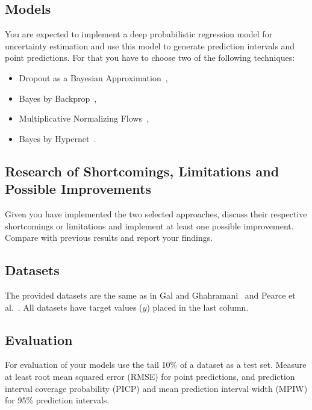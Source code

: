 \documentclass[a4paper, 12pt]{article}
\begin{document}
\subsection{Models}
\label{sec:Models}

You are expected to implement a deep probabilistic regression model for uncertainty estimation and
use this model to generate prediction intervals and point predictions. For that you have to choose
two of the following techniques:

\begin{itemize}
 \item Dropout as a Bayesian Approximation~\cite{pmlr-v48-gal16},
 \item Bayes by Backprop~\cite{pmlr-v37-blundell15},
 \item Multiplicative Normalizing Flows~\cite{pmlr-v70-louizos17a},
 \item Bayes by Hypernet~\cite{krueger2017bayesian,DBLP:journals/corr/abs-1711-01297}.
\end{itemize}


\subsection{Research of Shortcomings, Limitations and Possible Improvements}
\label{sec:Research}

Given you have implemented the two selected approaches, discuss their respective shortcomings or
limitations and implement at least one possible improvement. Compare with previous results and
report your findings.

\subsection{Datasets}
\label{sec:Datasets}

The provided datasets are the same as in Gal and Ghahramani~\cite{pmlr-v48-gal16} and Pearce et
al.~\cite{pmlr-v80-pearce18a}. All datasets have target values ($y$) placed in the last column.

\subsection{Evaluation}
\label{sec:Evaluation}

For evaluation of your models use the tail 10\% of a dataset as a test set. Measure at least root
mean squared error (RMSE) for point predictions, and prediction interval coverage probability (PICP)
and mean prediction interval width (MPIW) for 95\% prediction intervals.
\end{document}
